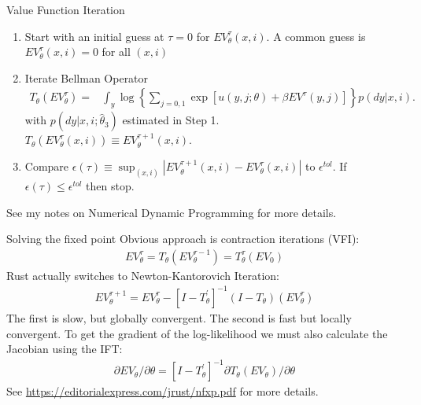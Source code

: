 \documentclass[aspectratio=169,11pt]{beamer}
\begin{document}
\begin{frame}{Value Function Iteration}
\footnotesize
\begin{enumerate}
\item Start with an initial guess at $\tau=0$ for $EV^{\tau}_{\theta}(x,i)$. A common guess is $EV_{\theta}^{\tau}(x,i) = 0$ for all $(x,i)$
\item Iterate Bellman Operator
\begin{align*}
T_{\theta}\left(EV_{\theta}^{\tau}\right)= & \int_y \log  \left \{ \sum_{j=0,1} \exp [ u(y, j ; \theta)  + \beta EV^{\tau}(y,j)] \right \} p(dy|x,i).
\end{align*}
with $p(dy | x, i; \hat \theta_3)$ estimated in Step 1.\\

$T_{\theta}\left(EV_{\theta}^{\tau}(x,i)\right)\equiv EV_{\theta}^{\tau+1}(x,i)$.\\
\item Compare $\epsilon(\tau) \equiv \sup_{(x,i)} | EV_{\theta}^{\tau+1}(x,i) - EV_{\theta}^{\tau}(x,i)|$ to $\epsilon^{tol}$. If $\epsilon(\tau) \leq \epsilon^{tol}$ then stop.
\end{enumerate}
See my notes on Numerical Dynamic Programming for more details.
\end{frame}

\begin{frame}{Solving the fixed point}
Obvious approach is contraction iterations (VFI):
\begin{align*}
E V_{\theta}^{\tau}=T_{\theta}\left(E V_{\theta}^{\tau-1}\right)=T_{\theta}^{\tau}\left(E V_{0}\right)
\end{align*}
Rust actually switches to Newton-Kantorovich Iteration:
\begin{align*}
E V_{\theta}^{\tau+1}=E V_{\theta}^{\tau}-\left[I-T_{\theta}^{\prime}\right]^{-1}\left(I-T_{\theta}\right)\left(E V_{\theta}^{\tau}\right)
\end{align*}
The first is slow, but globally convergent. The second is fast but locally convergent. To get the gradient of the log-likelihood we must also calculate the Jacobian using the IFT:
\begin{align*}
\partial E V_{\theta} / \partial \theta=\left[I-T_{\theta}^{\prime}\right]^{-1} \partial T_{\theta}\left(E V_{\theta}\right) / \partial \theta
\end{align*}
See \url{https://editorialexpress.com/jrust/nfxp.pdf} for more details.
\end{frame}
\end{document}
